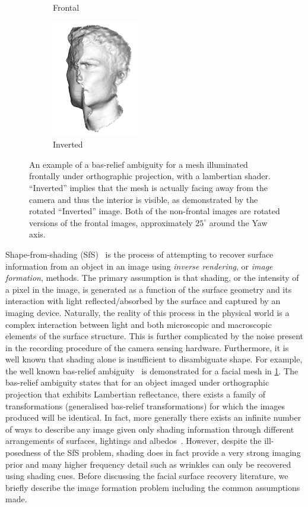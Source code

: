 \begin{figure}[t]
\begin{subfigure}[b]{0.24\textwidth}
		\caption*{Frontal}
	\end{subfigure}
	\begin{subfigure}[b]{0.24\textwidth}
		\centering
		\includegraphics[height=2in]{background/images/invert_rotate}
		\caption*{Inverted}
	\end{subfigure}
	\caption{An example of a bas-relief ambiguity for a mesh illuminated
	         frontally under orthographic projection, with a lambertian shader.
	         ``Inverted'' implies that the mesh is actually facing away from the
	         camera and thus the interior is visible, as demonstrated by the
	         rotated ``Inverted'' image. Both of the non-frontal images are
	         rotated versions of the frontal images, approximately $25^\circ$
	         around the Yaw axis.}
\label{fig:bg_sfs_bas_relief}
\end{figure}
Shape-from-shading (SfS)~\cite{horn1970shape} is the process of attempting to
recover surface information from an object in an image using \textit{inverse
rendering}, or \textit{image formation}, methods. The primary assumption is that
shading, or the intensity of a pixel in the image, is generated as a function of
the surface geometry and its interaction with light reflected/absorbed by the
surface and captured by an imaging device. Naturally, the reality of this
process in the physical world is a complex interaction between light and both
microscopic and macroscopic elements of the surface structure. This is further
complicated by the noise present in the recording procedure of the camera
sensing hardware. Furthermore, it is well known that shading alone is
insufficient to disambiguate shape. For example, the well known bas-relief
ambiguity~\cite{belhumeur1999bas} is demonstrated for a facial mesh in
\cref{fig:bg_sfs_bas_relief}. The bas-relief ambiguity states that for an object
imaged under orthographic projection that exhibits Lambertian reflectance, there
exists a family of transformations (generalised bas-relief transformations) for
which the images produced will be identical. In fact, more generally there
exists an infinite number of ways to describe any image given only shading
information through different arrangements of surfaces, lightings and
albedos~\cite{adelson1996perception}. However, despite the ill-posedness of the
SfS problem, shading does in fact provide a very strong imaging prior and many
higher frequency detail such as wrinkles can only be recovered using shading
cues. Before discussing the facial surface recovery literature, we briefly
describe the image formation problem including the common assumptions
made.
